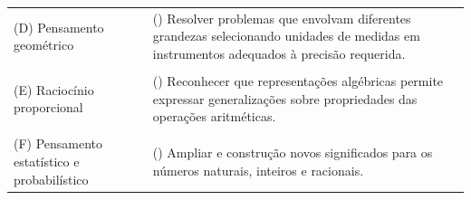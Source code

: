 \documentclass[a4paper, 12pt]{article}
\begin{document}
\begin{enumerate}
\begin{tabular}{m{5cm} m{5cm}}
    (D) Pensamento geométrico & () Resolver problemas que envolvam diferentes grandezas selecionando unidades de medidas em instrumentos adequados à precisão requerida. \\ \\
    (E) Raciocínio proporcional & () Reconhecer que representações algébricas permite expressar generalizações sobre propriedades das operações aritméticas. \\ \\
    (F) Pensamento estatístico e probabilístico & () Ampliar e construção novos significados para os números naturais, inteiros e racionais.
  \end{tabular}
\end{enumerate}
\end{document}
